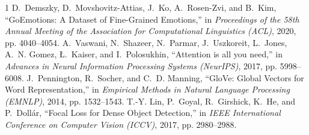 \documentclass[10pt,twocolumn,letterpaper]{article}
\begin{document}

\begin{thebibliography}{1}
D.~Demszky, D.~Movshovitz-Attias, J.~Ko, A.~Rosen-Zvi, and B.~Kim, ``GoEmotions: A Dataset of Fine-Grained Emotions,'' in \emph{Proceedings of the 58th Annual Meeting of the Association for Computational Linguistics (ACL)}, 2020, pp. 4040--4054.
A.~Vaswani, N.~Shazeer, N.~Parmar, J.~Uszkoreit, L.~Jones, A.~N. Gomez, {\L}.~Kaiser, and I.~Polosukhin, ``Attention is all you need,'' in \emph{Advances in Neural Information Processing Systems (NeurIPS)}, 2017, pp. 5998--6008.
J.~Pennington, R.~Socher, and C.~D. Manning, ``GloVe: Global Vectors for Word Representation,'' in \emph{Empirical Methods in Natural Language Processing (EMNLP)}, 2014, pp. 1532--1543.
T.-Y. Lin, P.~Goyal, R.~Girshick, K.~He, and P.~Doll{\'a}r, ``Focal Loss for Dense Object Detection,'' in \emph{IEEE International Conference on Computer Vision (ICCV)}, 2017, pp. 2980--2988.
\end{thebibliography}
\end{document}
